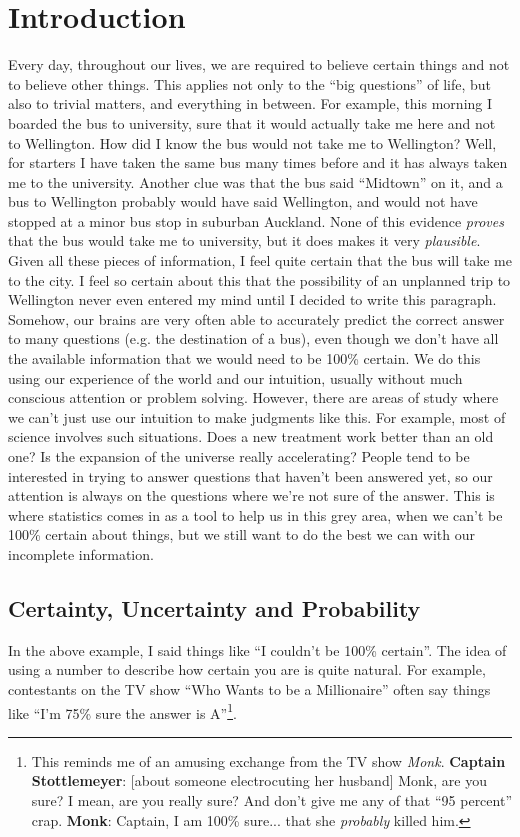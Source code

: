 \chapter{Introduction}
Every day, throughout our lives, we are required 
to believe certain things and not to believe other things. This applies not
only to the ``big questions'' of life, but also to trivial matters, and 
everything in between. For example, this morning I boarded the bus to 
university, sure that it would actually take me here and not to Wellington.
How did I know the bus would not take me to Wellington? Well, for starters
I have taken the same bus many times before and it has always taken me to the
university. Another clue was that the bus said ``Midtown'' on it, and a bus
to Wellington probably would have said Wellington, and would not have stopped
at a minor bus stop in suburban Auckland.
None of this evidence {\it proves} that the bus would take me to university,
but it does makes it very {\it plausible}. Given all these pieces of information, I feel
quite certain that the bus will take me to the city. I feel so certain
about this that the possibility of an
unplanned trip to Wellington never even entered my mind until I decided to
write this paragraph.\\

Somehow, our brains are very often able to accurately predict the correct answer
to many questions (e.g. the destination of a bus), even though we don't have
all the available information that we would need to be 100\% certain.
We do this using our experience of the world and our intuition, usually 
without much conscious attention or problem solving. However, there are areas
of study where we can't just use our intuition to make judgments like this.
For example, most of science involves such situations. Does a new treatment
work better than an old one? Is the expansion of the universe really
accelerating? People tend to be
interested in trying to answer questions that haven't been answered yet, so our
attention is always on the questions where we're not sure of the answer.
This is where statistics comes in as a tool to help us in this grey area, when we can't
be 100\% certain about things, but we still want to do the best we can with our
incomplete information.\\

\section{Certainty, Uncertainty and Probability}
In the above example, I said things like ``I couldn't be 100\% certain''. The
idea of using a number to describe how certain you are is quite natural.
For example, contestants on the TV show ``Who Wants to be a Millionaire'' often say things
like ``I'm 75\% sure the answer is A''\footnote{This reminds me of an amusing
exchange from the TV show {\it Monk}. {\bf Captain Stottlemeyer}: [about someone electrocuting her husband] Monk, are you sure? I mean, are you really sure? And don't give me any of that ``95 percent'' crap.
{\bf Monk}: Captain, I am 100\% sure... that she {\it probably} killed him.}.\\

